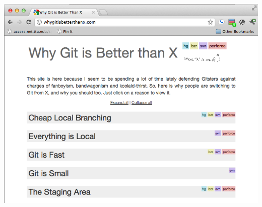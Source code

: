 \begin{frame}
\begin{center}
\includegraphics[scale=.4]{../figures/git/whygitisbetter.png}
\end{center}
\end{frame}
